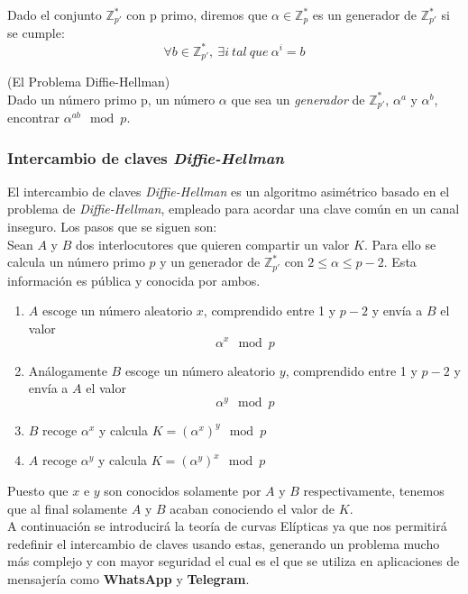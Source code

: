 \begin{definicion}
	Dado el conjunto $\mathbb{Z}^*_{p'}$ con p primo, diremos que $\alpha \in \mathbb{Z}^*_p$ es un generador de $\mathbb{Z}^*_{p'}$ si se cumple:\\
	$$
		\forall b \in \mathbb{Z}^*_{p'},\: \exists i\: tal \: que \: \alpha^i = b
	$$
\end{definicion}

\begin{definicion}
	(El Problema Diffie-Hellman)\\ Dado un número primo p, un número $\alpha$ que sea un \emph{generador} de $\mathbb{Z}^*_{p'}$, $\alpha^a$ y $\alpha^b$, encontrar $\alpha^{ab} \mod p$.  
\end{definicion}

\subsubsection{Intercambio de claves \emph{Diffie-Hellman}}
El intercambio de claves \emph{Diffie-Hellman} es un algoritmo asimétrico basado en el problema de \emph{Diffie-Hellman}, empleado para acordar una clave común en un canal inseguro. Los pasos que se siguen son:\\
Sean $A$ y $B$ dos interlocutores que quieren compartir un valor $K$. Para ello se calcula un número primo $p$ y un generador \alpha de $\mathbb{Z}^*_{p'}$ con $2\leq \alpha \leq p-2$. Esta información es pública y conocida por ambos.
\begin{enumerate}
	\item $A$ escoge un número aleatorio $x$, comprendido entre 1 y $p-2$ y envía a $B$ el valor 
		$$
			\alpha^x \mod p
		$$
	\item Análogamente $B$ escoge un número aleatorio $y$, comprendido entre 1 y $p-2$ y envía a $A$ el valor 
		$$
			\alpha^y \mod p
		$$

	\item $B$ recoge $\alpha^x$ y calcula $K=(\alpha^x)^y \mod p$
	\item $A$ recoge $\alpha^y$ y calcula $K=(\alpha^y)^x \mod p$
\end{enumerate}
Puesto que $x$ e $y$ son conocidos solamente por $A$ y $B$ respectivamente, tenemos que al final solamente $A$ y $B$ acaban conociendo el valor de $K$.\\
A continuación se introducirá la teoría de curvas Elípticas ya que nos permitirá redefinir el intercambio de claves usando estas, generando un problema mucho más complejo y con mayor seguridad el cual es el que se utiliza en aplicaciones de mensajería como \textbf{WhatsApp} y \textbf{Telegram}.

